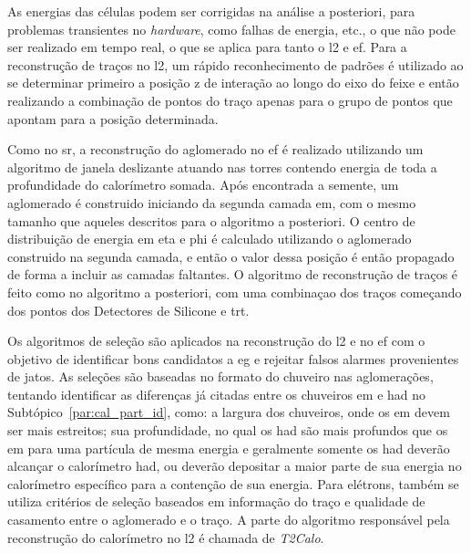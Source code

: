 As energias das células podem ser corrigidas na análise a posteriori, para
problemas transientes no \emph{hardware}, como falhas de energia, etc., o que não
pode ser realizado em tempo real, o que se aplica para tanto o \gls{l2} e
\gls{ef}. Para a reconstrução de traços no \gls{l2}, um rápido reconhecimento de
padrões é utilizado ao se determinar primeiro a posição z de interação ao longo
do eixo do feixe e então realizando a combinação de pontos do traço apenas para o grupo
de pontos que apontam para a posição determinada.

Como no \gls{sr}, a reconstrução do aglomerado no \gls{ef} é realizado
utilizando um algoritmo de janela deslizante atuando nas torres contendo energia
de toda a profundidade do calorímetro somada. Após encontrada
a semente, um aglomerado é construido iniciando da segunda camada \gls{em},
com o mesmo tamanho que aqueles descritos para o algoritmo a posteriori. O
centro de distribuição de energia em \gls{eta} e \gls{phi} é calculado
utilizando o aglomerado construido na segunda camada, e então o valor dessa
posição é então propagado de forma a incluir as camadas faltantes. O algoritmo
de reconstrução de traços é feito como no algoritmo a posteriori, com uma
combinaçao dos traços começando dos pontos dos Detectores de Silicone e
\gls{trt}. 

Os algoritmos de seleção são aplicados na reconstrução do
\gls{l2} e no \gls{ef} com o objetivo de identificar bons candidatos a \gls{eg}
e rejeitar falsos alarmes provenientes de jatos. As seleções são baseadas no
formato do chuveiro nas aglomerações, tentando identificar as diferenças já
citadas entre os chuveiros \gls{em} e \gls{had} no
Subtópico~\ref{par:cal_part_id}, como: a largura dos chuveiros, onde os \gls{em}
devem ser mais estreitos; sua profundidade, no qual os \gls{had} são mais
profundos que os \gls{em} para uma partícula de mesma energia e geralmente
somente os \gls{had} deverão alcançar o calorímetro \gls{had}, ou deverão
depositar a maior parte de sua energia no calorímetro específico para a
contenção de sua energia. Para elétrons, também se utiliza critérios de seleção 
baseados em informação do traço e qualidade de casamento entre o aglomerado e o
traço. A parte do algoritmo responsável pela reconstrução do calorímetro no
\gls{l2} é chamada de \emph{T2Calo}.


